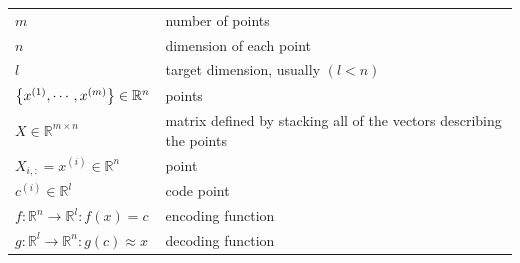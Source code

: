 \begin{customTableWrapper}{1.5}
\begin{longtable}{l p{10cm}}

$m$ & number of points \\

$n$ & dimension of each point \\

$l$ & target dimension, usually $(l<n)$ \\

\hline

$\left\{x^{(1)}, \cdots, x^{(m)}\right\} \in \mathbb{R}^n$ & points \\

$X \in \mathbb{R}^{m\times n}$ & matrix defined by stacking all of the vectors describing the points \\

$X_{i,:} = x^{(i)} \in \mathbb{R}^n$ & point \\


$c^{(i)} \in \mathbb{R}^l$ & code point \\

\hline

$f:\mathbb{R}^n \to \mathbb{R}^l : f(x) = c$ & encoding function \\

$g:\mathbb{R}^l \to \mathbb{R}^n:g(c) \approx x$ & decoding function \\

\end{longtable}
\end{customTableWrapper}

